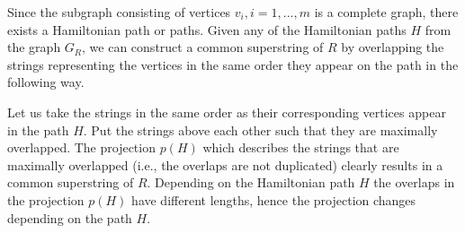 \documentclass[english,twoside,censored,csm,algorithms-track-2020]{HYthesisML}
\theoremstyle{plain}
\theoremstyle{definition}
\begin{document}

Since the subgraph consisting of vertices $v_i, i=1,...,m$ is a complete graph, there exists a
Hamiltonian path or paths. Given any
of the Hamiltonian paths $H$ from the graph $G_R$, we can construct a common superstring of $R$ by
overlapping the strings representing the vertices in the same order they appear on the path in the
following way.

Let us take the strings in the same order as their corresponding vertices appear in the path $H$. Put the
strings above each other such that they are maximally overlapped. The projection $p(H)$ which describes
the strings that are maximally overlapped (i.e., the overlaps are not duplicated) clearly results in a
common superstring of $R$. Depending on the Hamiltonian path $H$ the overlaps in the
projection $p(H)$ have different lengths, hence the projection changes depending on the path $H$. 
\end{document}
